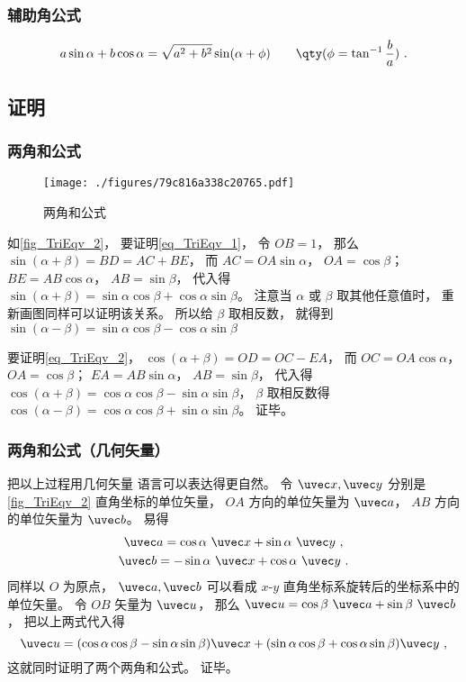 \subsubsection{辅助角公式}
\begin{equation}
a\sin \alpha + b\cos \alpha = \sqrt{a^2+b^2}\sin(\alpha + \phi) \qquad \qty(\phi = \tan^{-1}\frac{b}{a})~.
\end{equation}

\subsection{证明}\label{sub_TriEqv_1}
\subsubsection{两角和公式}
\begin{figure}[ht]
\centering
\texttt{[image: ./figures/79c816a338c20765.pdf]}
\caption{两角和公式} \label{fig_TriEqv_2}
\end{figure}
如\autoref{fig_TriEqv_2}， 要证明\autoref{eq_TriEqv_1}， 令 $OB = 1$， 那么 $\sin(\alpha+\beta) = BD = AC + BE$， 而 $AC = OA \sin\alpha$， $OA = \cos\beta$； $BE = AB\cos\alpha$， $AB = \sin\beta$， 代入得 $\sin(\alpha+\beta) = \sin\alpha\cos\beta + \cos\alpha\sin\beta$。 注意当 $\alpha$ 或 $\beta$ 取其他任意值时， 重新画图同样可以证明该关系。 所以给 $\beta$ 取相反数， 就得到 $\sin(\alpha-\beta) = \sin\alpha\cos\beta - \cos\alpha\sin\beta$

要证明\autoref{eq_TriEqv_2}， $\cos(\alpha+\beta) = OD = OC - EA$， 而 $OC = OA\cos\alpha$， $OA = \cos\beta$； $EA = AB\sin\alpha$， $AB = \sin\beta$， 代入得 $\cos(\alpha+\beta) = \cos\alpha\cos\beta - \sin\alpha\sin\beta$， $\beta$ 取相反数得 $\cos(\alpha-\beta) = \cos\alpha\cos\beta + \sin\alpha\sin\beta$。 证毕。

\subsubsection{两角和公式（几何矢量）}
把以上过程用几何矢量 语言可以表达得更自然。 令 $\uvec x, \uvec y$ 分别是\autoref{fig_TriEqv_2} 直角坐标的单位矢量， $OA$ 方向的单位矢量为 $\uvec a$， $AB$ 方向的单位矢量为 $\uvec b$。 易得
\begin{gather}
\uvec a = \cos\alpha\ \uvec x + \sin\alpha\ \uvec y~,\\
\uvec b = -\sin\alpha\ \uvec x + \cos\alpha\ \uvec y~.
\end{gather}
同样以 $O$ 为原点， $\uvec a, \uvec b$ 可以看成 $x$-$y$ 直角坐标系旋转后的坐标系中的单位矢量。 令 $OB$ 矢量为 $\uvec u$， 那么 $\uvec u = \cos\beta\ \uvec a + \sin\beta\ \uvec b$， 把以上两式代入得
\begin{equation}
\uvec u = (\cos\alpha\cos\beta - \sin\alpha\sin\beta)\uvec x + (\sin\alpha\cos\beta + \cos\alpha\sin\beta)\uvec y~,
\end{equation}
这就同时证明了两个两角和公式。 证毕。

